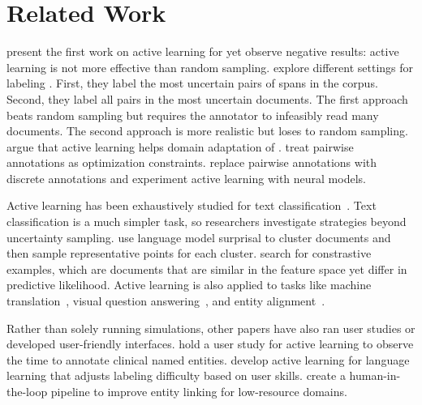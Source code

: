\section{Related Work}

\citet{gasperin-2009} present the first work on active learning for \coref{}
yet observe negative results:
active learning is not more effective
than random sampling.
\citet{miller-2012} explore
different settings for labeling \coref{}.
First, they
label the most uncertain pairs of spans in the corpus.
Second, they label all pairs in the most
uncertain documents.
The first approach beats random sampling but requires
the annotator to infeasibly read many documents.
The second approach is more realistic but loses to random sampling.
\citet{zhao-2014} argue that active learning helps domain adaptation of
\coref{}.
\citet{sachan-2015} treat
pairwise
annotations as optimization constraints.
\citet{li-2020} replace pairwise annotations with
discrete annotations and experiment active learning with neural models.

Active learning has been exhaustively studied for text
classification~\citep{lewis-1994,zhu-2008,zhang-2017}.
Text classification is a much simpler task, so researchers investigate  strategies beyond uncertainty sampling.
\citet{yuan-2020-alps} use language model surprisal to cluster documents and then
sample representative points for each cluster.
\citet{margatina-2021} search for constrastive examples, which are documents
that are similar in
the feature space yet differ in predictive likelihood.
Active learning is also applied to tasks like
machine
translation~\citep{liu-2018}, visual question
answering~\citep{karamcheti-2021}, and entity alignment~\citep{bing-2021}.

Rather than solely running simulations, other papers have also ran
user studies or developed user-friendly interfaces. \citet{wei-2019} hold a user study for active
learning to observe the time to annotate clinical named entities.
\citet{lee-2020} develop active learning for
language learning that adjusts labeling difficulty based on user
skills. \citet{klie-2020} create a human-in-the-loop pipeline to improve
entity linking for low-resource domains.
